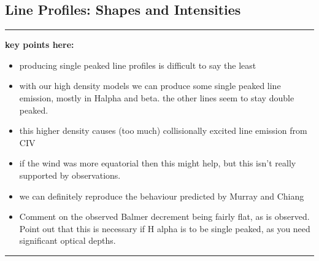 \documentclass[preprint, a4paper, 11pt]{aastex}
\begin{document}
\subsection{Line Profiles: Shapes and Intensities}

\noindent\rule{16cm}{0.4pt}

{\bf
\noindent key points here:

\begin{itemize}
	\item producing single peaked line profiles is difficult to say the least
	\item with our high density models we can produce some single peaked line emission,
	mostly in Halpha and beta. the other lines seem to stay double peaked.
	\item this higher density causes (too much) collisionally excited line emission from CIV
	\item if the wind was more equatorial then this might help, but this isn't really supported by observations.
	\item we can definitely reproduce the behaviour predicted by Murray and Chiang
	\item Comment on the observed Balmer decrement being fairly flat, as is observed. Point out that
	this is necessary if H alpha is to be single peaked, as you need significant optical depths.
\end{itemize}
}

\noindent\rule{16cm}{0.4pt}
\end{document}
